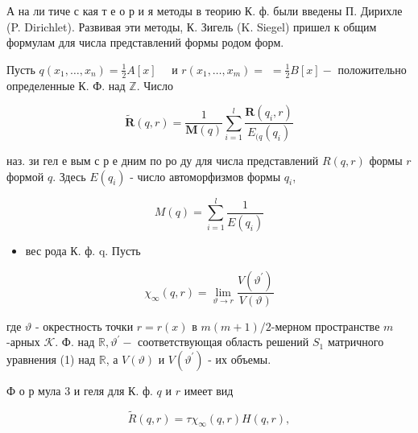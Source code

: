 \documentclass[10pt]{article}
\begin{document}
А на ли тиче с кая т е о р и я методы в теорию К. ф. были введены П. Дирихле (P. Dirichlet). Развивая эти методы, К. Зигель (K. Siegel) пришел к общим формулам для числа представлений формы родом форм.



Пусть $q\left(x_{1}, \ldots, x_{n}\right)=\frac{1}{2} A[x] \quad$ и $r\left(x_{1}, \ldots, x_{m}\right)=$ $=\frac{1}{2} B[x]-$ положительно определенные К. Ф. над $\mathbb{Z}$. Число



\[

\tilde{\boldsymbol{R}}(q, r)=\frac{1}{\boldsymbol{M}(q)} \sum_{i=1}^{l} \frac{\boldsymbol{R}\left(q_{i}, r\right)}{E_{(q}\left(q_{i}\right)}

\]



наз. зи гел е вым с р е дним по ро ду для числа представлений $R(q, r)$ формы $r$ формой $q$. Здесь $E\left(q_{i}\right)$ - число автоморфизмов формы $q_{i}$,



\[

M(q)=\sum_{i=1}^{l} \frac{1}{E\left(q_{i}\right)}

\]



\begin{itemize}

  \item вес рода К. ф. q. Пусть

\end{itemize}



\[

\chi_{\infty}(q, r)=\lim _{\vartheta \rightarrow r} \frac{V\left(\vartheta^{\prime}\right)}{V(\vartheta)}

\]



где $\vartheta$ - окрестность точки $r=r(x)$ в $m(m+1) / 2$-мерном пространстве $m$-арных $\mathcal{K}$. Ф. над $\mathbb{R}, \vartheta^{\prime}-$ соответствующая область решений $S_{1}$ матричного уравнения (1) над $\mathbb{R}$, а $V(\vartheta)$ и $V\left(\vartheta^{\prime}\right)$ - их объемы.



Ф о р мула 3 и геля для К. ф. $q$ и $r$ имеет вид



\[

\tilde{R}(q, r)=\tau \chi_{\infty}(q, r) H(q, r),

\]
\end{document}
